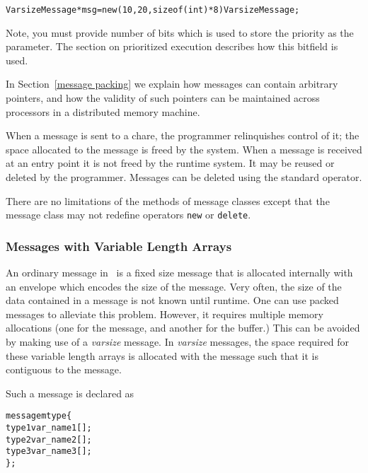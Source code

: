 \begin{alltt}
VarsizeMessage *msg = new (10, 20, sizeof(int)*8) VarsizeMessage;
\end{alltt}

Note, you must provide number of bits which is used to store the priority as
the  parameter. The section on prioritized execution describes how
this bitfield is used.

In Section~\ref{message packing} we explain how messages can contain arbitrary
pointers, and how the validity of such pointers can be maintained across
processors in a distributed memory machine.

When a message  is sent to a chare, the programmer
relinquishes control of it; the space allocated to the message is freed by the
system.  When a message is received at an entry point it is not freed by the
runtime system.  It may be reused or deleted by the programmer.  Messages can
be deleted using the standard \CC{}  operator.  

There are no limitations of the methods of message classes except that the
message class may not redefine operators \texttt{new} or \texttt{delete}.


\subsubsection{Messages with Variable Length Arrays}

\label{varsize messages}

An ordinary message in \charmpp\ is a fixed size message that is allocated
internally with an envelope which encodes the size of the message. Very often,
the size of the data contained in a message is not known until runtime. One can
use packed messages to alleviate this problem.  However,
it requires multiple memory allocations (one for the message, and another for
the buffer.) This can be avoided by making use of a \emph{varsize} message.
In \emph{varsize} messages, the space required for these variable length arrays
is allocated with the message such that it is contiguous to the message.

Such a message is declared as 

\begin{alltt}
 message mtype \{
   type1 var_name1[];
   type2 var_name2[];
   type3 var_name3[];
 \};
\end{alltt}

